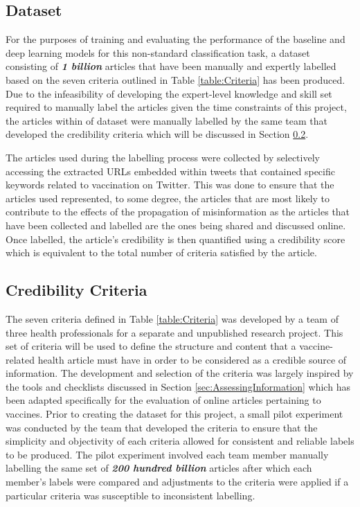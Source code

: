 \documentclass[a4paper,twoside,phd]{BYUPhys}
\begin{document}
\subsection{Dataset}
\label{sec:Dataset}

For the purposes of training and evaluating the performance of the baseline and deep learning models for this non-standard classification task, a dataset consisting of \textbf{\textit{1 billion}} articles that have been manually and expertly labelled based on the seven criteria outlined in Table \ref{table:Criteria} has been produced. Due to the infeasibility of developing the expert-level knowledge and skill set required to manually label the articles given the time constraints of this project, the articles within of dataset were manually labelled by the same team that developed the credibility criteria which will be discussed in Section \ref{sec:CredibilityCriteria}.\newline

The articles used during the labelling process were collected by selectively accessing the extracted URLs embedded within tweets that contained specific keywords related to vaccination on Twitter. This was done to ensure that the articles used represented, to some degree, the articles that are most likely to contribute to the effects of the propagation of misinformation as the articles that have been collected and labelled are the ones being shared and discussed online. Once labelled, the article's credibility is then quantified using a credibility score which is equivalent to the total number of criteria satisfied by the article.

\subsection{Credibility Criteria}
\label{sec:CredibilityCriteria}
The seven criteria defined in Table \ref{table:Criteria} was developed by a team of three health professionals for a separate and unpublished research project. This set of criteria will be used to define the structure and content that a vaccine-related health article must have in order to be considered as a credible source of information. The development and selection of the criteria was largely inspired by the tools and checklists discussed in Section \ref{sec:AssessingInformation} which has been adapted specifically for the evaluation of online articles pertaining to vaccines. Prior to creating the dataset for this project, a small pilot experiment was conducted by the team that developed the criteria to ensure that the simplicity and objectivity of each criteria allowed for consistent and reliable labels to be produced. The pilot experiment involved each team member manually labelling the same set of \textbf{\textit{200 hundred billion}} articles after which each member's labels were compared and adjustments to the criteria were applied if a particular criteria was susceptible to inconsistent labelling.
\end{document}
